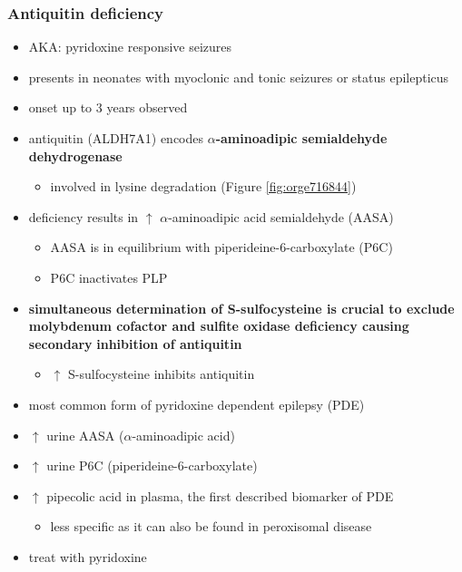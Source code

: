 \documentclass[12pt]{scrartcl}
\begin{document}
\subsubsection{Antiquitin deficiency}
\label{sec:org03db45a}
\begin{itemize}
\item AKA: pyridoxine responsive seizures
\item presents in neonates with myoclonic and tonic seizures or
status epilepticus
\item onset up to 3 years observed
\item antiquitin (ALDH7A1) encodes \textbf{\(\alpha\)-aminoadipic semialdehyde dehydrogenase}
\begin{itemize}
\item involved in lysine degradation (Figure \ref{fig:orge716844})
\end{itemize}
\end{itemize}
\begin{itemize}
\item deficiency results in \(\uparrow\) \(\alpha\)-aminoadipic acid semialdehyde (AASA)
\begin{itemize}
\item AASA is in equilibrium with piperideine-6-carboxylate (P6C)
\item P6C inactivates PLP
\end{itemize}
\end{itemize}
\begin{itemize}
\item \textbf{simultaneous determination of S-sulfocysteine is crucial to exclude}
\textbf{molybdenum cofactor and sulfite oxidase deficiency causing secondary}
\textbf{inhibition of antiquitin}
\begin{itemize}
\item \(\uparrow\) S-sulfocysteine inhibits antiquitin
\end{itemize}
\item most common form of pyridoxine dependent epilepsy (PDE)
\item \(\uparrow\) urine AASA (\(\alpha\)-aminoadipic acid)
\item \(\uparrow\) urine P6C (piperideine-6-carboxylate)
\item \(\uparrow\) pipecolic acid in plasma, the first described biomarker of PDE
\begin{itemize}
\item less specific as it can also be found in peroxisomal disease
\end{itemize}
\item treat with pyridoxine
\end{itemize}
\end{document}
